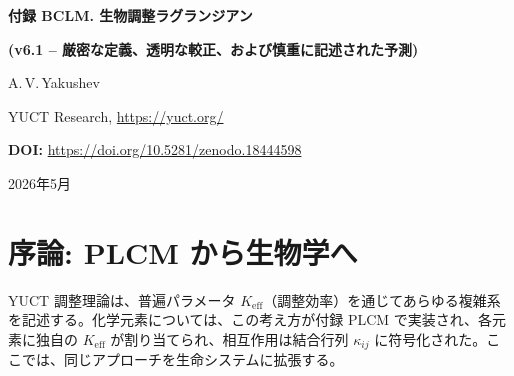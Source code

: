 \documentclass[12pt,a4paper]{ltjsarticle}
\newcommand{\REL}{\mathcal{K}}          %
\begin{document}
	
	\begin{titlepage}
		\centering
		\vspace*{2cm}
		{\Huge\bfseries 付録 BCLM. 生物調整ラグランジアン\par}
		\vspace{0.3cm}
		{\Large\bfseries (v6.1 – 厳密な定義、透明な較正、および慎重に記述された予測)\par}
		\vspace{1.5cm}
		{\large A.\,V.\,Yakushev\par}
		{\normalsize YUCT Research, \url{https://yuct.org/}\par}
		
		\vspace{1.0cm}
		{\normalsize \textbf{DOI:} \url{https://doi.org/10.5281/zenodo.18444598}\par}
		\vspace{1.0cm}
		{\normalsize 2026年5月\par}
		\vfill
		\begin{abstract}
			\noindent
			本稿では、生物調整ラグランジアン (BCLM) を Yakushev 統一調整理論 (YUCT) の一貫したデータ駆動型モジュールとして提示する。
			すべての生物学的オブジェクトには、YPSDC プロトコルによって統一された方法で定義される相対調整効率 \(\REL\) が割り当てられる。これは圧縮比 \(H(\mathcal{A})/H(\kappa)\) を理論的最大値で正規化したものである。
			コドン、アミノ酸、酵素、突然変異関連修復効率、アロメトリー定数、ニューロンパラメータの完全な表を提供する。
			YUCT 定数から導出され、タンパク質間結合データに基づいて較正された普遍的な代数的適合性規則が、任意の二つの生物学的実体間の相互作用を支配する。
			長寿命プロトコルは、反証可能な定量的仮説として定式化され、その予測は普遍誤差則と細胞層の乗算的誤差構造から導出される。
			主要な高度モジュール（時間調整、免疫、毒物、多生物体、シャペロン、翻訳後修飾）が復元され、統一された \(\REL\) フレームワークで表現される。
			科学的厳密性を確保するために、すべての定義、較正、限界について議論する。
		\end{abstract}
	\end{titlepage}
	
	\tableofcontents
	\newpage
	
	\section{序論: PLCM から生物学へ}
	YUCT 調整理論は、普遍パラメータ \(K_{\mathrm{eff}}\)（調整効率）を通じてあらゆる複雑系を記述する。化学元素については、この考え方が付録 PLCM で実装され、各元素に独自の \(K_{\mathrm{eff}}\) が割り当てられ、相互作用は結合行列 \(\kappa_{ij}\) に符号化された。ここでは、同じアプローチを生命システムに拡張する。
	
\end{document}
